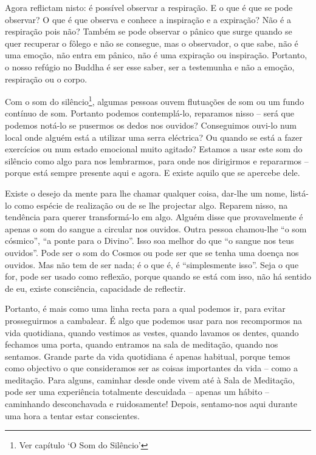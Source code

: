 Agora reflictam nisto: é possível observar a respiração. E o que é que se pode
observar? O que é que observa e conhece a inspiração e a expiração? Não é a
respiração pois não? Também se pode observar o pânico que surge quando se quer
recuperar o fôlego e não se consegue, mas o observador, o que sabe, não é uma
emoção, não entra em pânico, não é uma expiração ou inspiração. Portanto, o
nosso refúgio no Buddha é ser esse saber, ser a testemunha e não a emoção,
respiração ou o corpo.

Com o som do silêncio\footnote{Ver capítulo `O Som do Silêncio'}, algumas
pessoas ouvem flutuações de som ou um fundo contínuo de som. Portanto podemos
contemplá-lo, reparamos nisso -- será que podemos notá-lo se pusermos os dedos
nos ouvidos? Conseguimos ouvi-lo num local onde alguém está a utilizar uma
serra eléctrica? Ou quando se está a fazer exercícios ou num estado emocional
muito agitado? Estamos a usar este som do silêncio como algo para nos
lembrarmos, para onde nos dirigirmos e repararmos -- porque está sempre presente
aqui e agora. E existe aquilo que se apercebe dele.

Existe o desejo da mente para lhe chamar qualquer coisa, dar-lhe um nome,
listá-lo como espécie de realização ou de se lhe projectar algo. Reparem nisso,
na tendência para querer transformá-lo em algo. Alguém disse que provavelmente
é apenas o som do sangue a circular nos ouvidos. Outra pessoa chamou-lhe ``o
som cósmico'', ``a ponte para o Divino''. Isso soa melhor do que ``o sangue nos
teus ouvidos''. Pode ser o som do Cosmos ou pode ser que se tenha uma doença nos
ouvidos. Mas não tem de ser nada; é o que é, é ``simplesmente isso''. Seja o que
for, pode ser usado como reflexão, porque quando se está com isso, não há
sentido de eu, existe consciência, capacidade de reflectir.

Portanto, é mais como uma linha recta para a qual podemos ir, para evitar
prosseguirmos a cambalear. É algo que podemos usar para nos recompormos na vida
quotidiana, quando vestimos as vestes, quando lavamos os dentes, quando fechamos
uma porta, quando entramos na sala de meditação, quando nos sentamos. Grande
parte da vida quotidiana é apenas habitual, porque temos como objectivo o que
consideramos ser as coisas importantes da vida -- como a meditação. Para alguns,
caminhar desde onde vivem até à Sala de Meditação, pode ser uma experiência
totalmente descuidada -- apenas um hábito -- caminhando desconchavada e
ruidosamente! Depois, sentamo-nos aqui durante uma hora a tentar estar
conscientes.

